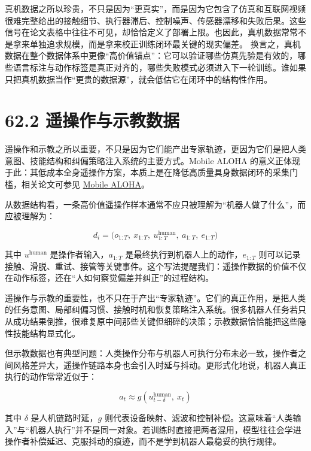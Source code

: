 真机数据之所以珍贵，不只是因为“更真实”，而是因为它包含了仿真和互联网视频很难完整给出的接触细节、执行器滞后、控制噪声、传感器漂移和失败后果。这些信号在论文表格中往往不可见，却恰恰定义了部署上限。也因此，真机数据常常不是拿来单独追求规模，而是拿来校正训练闭环最关键的现实偏差。 换言之，真机数据在整个数据体系中更像“高价值锚点”：它可以验证哪些仿真先验是有效的，哪些语言标注与动作标签是真正对齐的，哪些失败模式必须进入下一轮训练。谁如果只把真机数据当作“更贵的数据源”，就会低估它在闭环中的结构性作用。

\section*{62.2 遥操作与示教数据}


遥操作和示教之所以重要，不只是因为它们能产出专家轨迹，更因为它们是把人类意图、技能结构和纠偏策略注入系统的主要方式。Mobile ALOHA 的意义正体现于此：其低成本全身遥操作方案，本质上是在降低高质量具身数据闭环的采集门槛，相关论文可参见 \href{https://arxiv.org/abs/2401.02117}{Mobile ALOHA}。

从数据结构看，一条高价值遥操作样本通常不应只被理解为“机器人做了什么”，而应被理解为：

\begingroup
\footnotesize
\begin{equation*}
d_i = \bigl(o_{1:T},\ x_{1:T},\ u^{\text{human}}_{1:T},\ a_{1:T},\ e_{1:T}\bigr)
\end{equation*}
\endgroup

其中 \(u^{\text{human}}\) 是操作者输入，\(a_{1:T}\) 是最终执行到机器人上的动作，\(e_{1:T}\) 则可以记录接触、滑脱、重试、接管等关键事件。这个写法提醒我们：遥操作数据的价值不仅在动作标签，还在“人如何察觉偏差并纠正”的过程结构。

遥操作与示教的重要性，也不只在于产出“专家轨迹”。它们的真正作用，是把人类的任务意图、局部纠偏习惯、接触时机和恢复策略注入系统。很多机器人任务若只从成功结果倒推，很难复原中间那些关键但细碎的决策；示教数据恰恰能把这些隐性技能结构显式化。

但示教数据也有典型问题：人类操作分布与机器人可执行分布未必一致，操作者之间风格差异大，遥操作链路本身也会引入时延与抖动。更形式化地说，机器人真正执行的动作常常近似于：

\begingroup
\footnotesize
\begin{equation*}
a_t \approx g\!\left(u^{\text{human}}_{t-\delta},\ x_t\right)
\end{equation*}
\endgroup

其中 \(\delta\) 是人机链路时延，\(g\) 则代表设备映射、滤波和控制补偿。这意味着“人类输入”与“机器人执行”并不是同一对象。若训练时直接把两者混用，模型往往会学进操作者补偿延迟、克服抖动的痕迹，而不是学到机器人最稳妥的执行规律。

